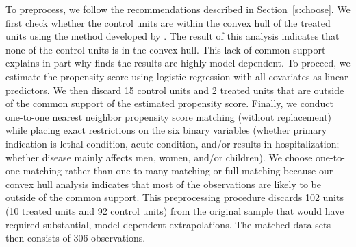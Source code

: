 \documentclass[11pt,titlepage]{article}
\begin{document}
To preprocess, we follow the recommendations described in
Section~\ref{s:choose}. We first check whether the control units are
within the convex hull of the treated units using the method developed
by \citet{KinZen06b}. The result of this analysis indicates that none
of the control units is in the convex hull. This lack of
common support explains in part why \citet{Carpenter02} finds the
results are highly model-dependent. To proceed, we estimate the
propensity score using logistic regression with all covariates as
linear predictors.  We then discard 15 control units and 2 treated
units that are outside of the common support of the estimated
propensity score. Finally, we conduct one-to-one nearest neighbor
propensity score matching (without replacement) while placing exact
restrictions on the six binary variables (whether primary indication
is lethal condition, acute condition, and/or results in
hospitalization; whether disease mainly affects men, women, and/or
children). We choose one-to-one matching rather than one-to-many
matching or full matching because our convex hull analysis indicates
that most of the observations are likely to be outside of the common
support.  This preprocessing procedure discards 102 units (10 treated
units and 92 control units) from the original sample that would have
required substantial, model-dependent extrapolations. The matched data
sets then consists of 306 observations.
\end{document}
